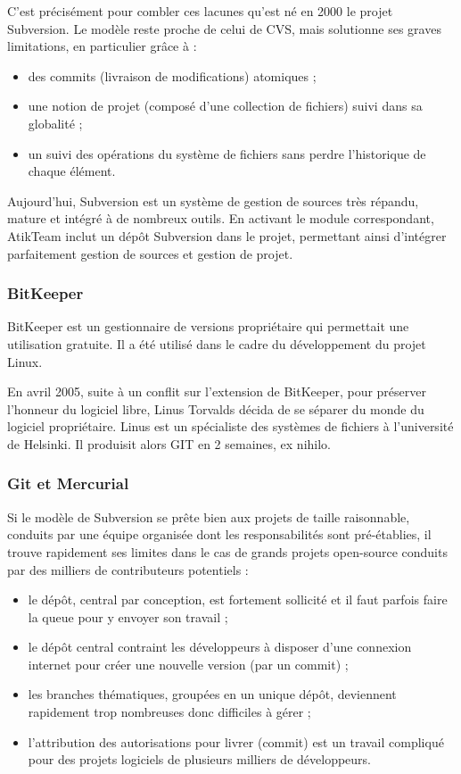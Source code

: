 C'est précisément pour combler ces lacunes qu'est né en 2000 le projet Subversion. Le modèle reste proche de celui de CVS, mais solutionne ses graves limitations, en particulier grâce à :
\begin{itemize}
\item des commits (livraison de modifications) atomiques ;
\item une notion de projet (composé d'une collection de fichiers) suivi dans sa globalité ;
\item un suivi des opérations du système de fichiers sans perdre l'historique de chaque élément.
\end{itemize}

Aujourd'hui, Subversion est un système de gestion de sources très répandu, mature et intégré à de nombreux outils. En activant le module correspondant, AtikTeam inclut un dépôt Subversion dans le projet, permettant ainsi d'intégrer parfaitement gestion de sources et gestion de projet.

\subsubsection{BitKeeper}

BitKeeper est un gestionnaire de versions propriétaire qui permettait une utilisation gratuite. Il a été utilisé dans le cadre du développement du projet Linux. 

En avril 2005, suite à un conflit sur l'extension de BitKeeper, pour préserver l'honneur du logiciel libre, Linus Torvalds décida de se séparer du monde du logiciel propriétaire. Linus est un spécialiste des systèmes de fichiers à l'université de Helsinki. Il produisit alors GIT en 2 semaines, ex nihilo. 

\subsubsection{Git et Mercurial}
Si le modèle de Subversion se prête bien aux projets de taille raisonnable, conduits par une équipe organisée dont les responsabilités sont pré-établies, il trouve rapidement ses limites dans le cas de grands projets open-source conduits par des milliers de contributeurs potentiels :
\begin{itemize}
\item le dépôt, central par conception, est fortement sollicité et il faut parfois faire la queue pour y envoyer son travail ;
\item le dépôt central contraint les développeurs à disposer d'une connexion internet pour créer une nouvelle version (par un commit) ;
\item les branches thématiques, groupées en un unique dépôt, deviennent rapidement trop nombreuses donc difficiles à gérer ;
\item l'attribution des autorisations pour livrer (commit) est un travail compliqué pour des projets logiciels de plusieurs milliers de développeurs.
\end{itemize}

